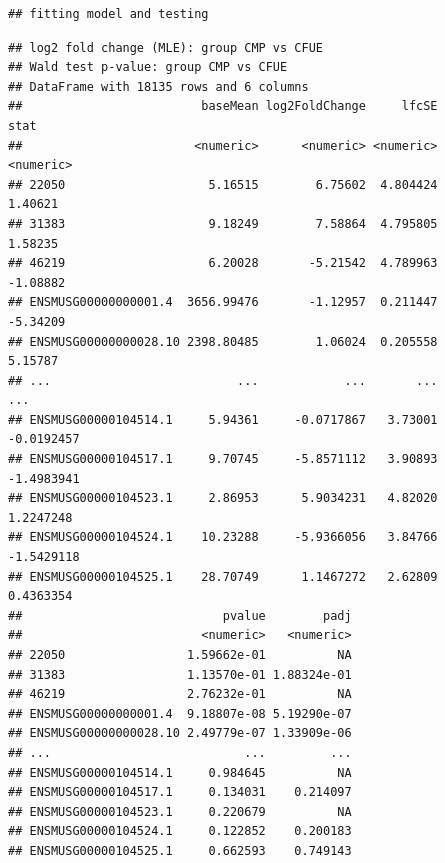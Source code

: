 \documentclass[
]{article}
\newenvironment{Shaded}{\begin{snugshade}}{\end{snugshade}}
\newcommand{\AttributeTok}[1]{\textcolor[rgb]{0.13,0.29,0.53}{#1}}
\newcommand{\CommentTok}[1]{\textcolor[rgb]{0.56,0.35,0.01}{\textit{#1}}}
\newcommand{\DecValTok}[1]{\textcolor[rgb]{0.00,0.00,0.81}{#1}}
\newcommand{\FunctionTok}[1]{\textcolor[rgb]{0.13,0.29,0.53}{\textbf{#1}}}
\newcommand{\NormalTok}[1]{#1}
\newcommand{\OtherTok}[1]{\textcolor[rgb]{0.56,0.35,0.01}{#1}}
\newcommand{\SpecialCharTok}[1]{\textcolor[rgb]{0.81,0.36,0.00}{\textbf{#1}}}
\newcommand{\StringTok}[1]{\textcolor[rgb]{0.31,0.60,0.02}{#1}}
\begin{document}
\begin{verbatim}
## fitting model and testing
\end{verbatim}

\begin{Shaded}
\end{Shaded}

\begin{verbatim}
## log2 fold change (MLE): group CMP vs CFUE 
## Wald test p-value: group CMP vs CFUE 
## DataFrame with 18135 rows and 6 columns
##                         baseMean log2FoldChange     lfcSE       stat
##                        <numeric>      <numeric> <numeric>  <numeric>
## 22050                    5.16515        6.75602  4.804424    1.40621
## 31383                    9.18249        7.58864  4.795805    1.58235
## 46219                    6.20028       -5.21542  4.789963   -1.08882
## ENSMUSG00000000001.4  3656.99476       -1.12957  0.211447   -5.34209
## ENSMUSG00000000028.10 2398.80485        1.06024  0.205558    5.15787
## ...                          ...            ...       ...        ...
## ENSMUSG00000104514.1     5.94361     -0.0717867   3.73001 -0.0192457
## ENSMUSG00000104517.1     9.70745     -5.8571112   3.90893 -1.4983941
## ENSMUSG00000104523.1     2.86953      5.9034231   4.82020  1.2247248
## ENSMUSG00000104524.1    10.23288     -5.9366056   3.84766 -1.5429118
## ENSMUSG00000104525.1    28.70749      1.1467272   2.62809  0.4363354
##                            pvalue        padj
##                         <numeric>   <numeric>
## 22050                 1.59662e-01          NA
## 31383                 1.13570e-01 1.88324e-01
## 46219                 2.76232e-01          NA
## ENSMUSG00000000001.4  9.18807e-08 5.19290e-07
## ENSMUSG00000000028.10 2.49779e-07 1.33909e-06
## ...                           ...         ...
## ENSMUSG00000104514.1     0.984645          NA
## ENSMUSG00000104517.1     0.134031    0.214097
## ENSMUSG00000104523.1     0.220679          NA
## ENSMUSG00000104524.1     0.122852    0.200183
## ENSMUSG00000104525.1     0.662593    0.749143
\end{verbatim}
\end{document}
